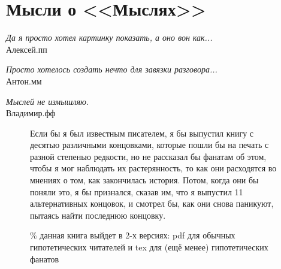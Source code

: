 \pagecolor{white}
\section*{Мысли о <<Мыслях>>}

\begin{flushright}
\emph{Да я просто хотел картинку показать, а оно вон как...}\\
    Алексей.пп %
\end{flushright}
\vspace{1cm}
\begin{flushright}
\emph{Просто хотелось создать нечто для завязки разговора...}\\
Антон.мм %
\end{flushright}
\vspace{1cm}
\begin{flushright}
\emph{Мыслей не измышляю.}\\
Владимир.фф %
\end{flushright}
\vspace{1.5cm}
\begin{figure}[ht!]
    \Large
    Если бы я был известным писателем, я бы выпустил книгу с десятью различными концовками, которые пошли бы на печать с разной степенью редкости, но не рассказал бы фанатам об этом, чтобы я мог наблюдать их растерянность, то как они расходятся во мнениях о том, как закончилась история. Потом, когда они бы поняли это, я бы признался, сказав им, что я выпустил 11 альтернативных концовок, и смотрел бы, как они снова паникуют, пытаясь найти последнюю концовку.
    \caption{\% данная книга выйдет в 2-х версиях: pdf для обычных гипотетических читателей и tex для (ещё менее) гипотетических фанатов}
\end{figure}
